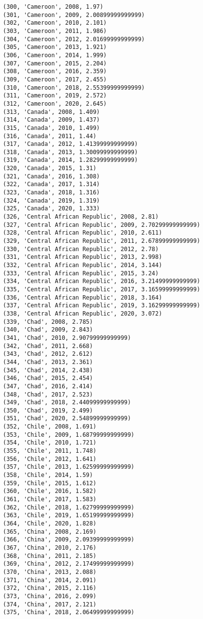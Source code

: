 \documentclass[11pt]{article}
\begin{document}
\begin{Verbatim}[commandchars=\\\{\}]
(300, 'Cameroon', 2008, 1.97)
(301, 'Cameroon', 2009, 2.00899999999999)
(302, 'Cameroon', 2010, 2.101)
(303, 'Cameroon', 2011, 1.986)
(304, 'Cameroon', 2012, 2.01699999999999)
(305, 'Cameroon', 2013, 1.921)
(306, 'Cameroon', 2014, 1.999)
(307, 'Cameroon', 2015, 2.204)
(308, 'Cameroon', 2016, 2.359)
(309, 'Cameroon', 2017, 2.455)
(310, 'Cameroon', 2018, 2.55399999999999)
(311, 'Cameroon', 2019, 2.572)
(312, 'Cameroon', 2020, 2.645)
(313, 'Canada', 2008, 1.409)
(314, 'Canada', 2009, 1.437)
(315, 'Canada', 2010, 1.499)
(316, 'Canada', 2011, 1.44)
(317, 'Canada', 2012, 1.41399999999999)
(318, 'Canada', 2013, 1.30099999999999)
(319, 'Canada', 2014, 1.28299999999999)
(320, 'Canada', 2015, 1.31)
(321, 'Canada', 2016, 1.308)
(322, 'Canada', 2017, 1.314)
(323, 'Canada', 2018, 1.316)
(324, 'Canada', 2019, 1.319)
(325, 'Canada', 2020, 1.333)
(326, 'Central African Republic', 2008, 2.81)
(327, 'Central African Republic', 2009, 2.70299999999999)
(328, 'Central African Republic', 2010, 2.611)
(329, 'Central African Republic', 2011, 2.67899999999999)
(330, 'Central African Republic', 2012, 2.78)
(331, 'Central African Republic', 2013, 2.998)
(332, 'Central African Republic', 2014, 3.144)
(333, 'Central African Republic', 2015, 3.24)
(334, 'Central African Republic', 2016, 3.21499999999999)
(335, 'Central African Republic', 2017, 3.16599999999999)
(336, 'Central African Republic', 2018, 3.164)
(337, 'Central African Republic', 2019, 3.16299999999999)
(338, 'Central African Republic', 2020, 3.072)
(339, 'Chad', 2008, 2.785)
(340, 'Chad', 2009, 2.843)
(341, 'Chad', 2010, 2.90799999999999)
(342, 'Chad', 2011, 2.668)
(343, 'Chad', 2012, 2.612)
(344, 'Chad', 2013, 2.361)
(345, 'Chad', 2014, 2.438)
(346, 'Chad', 2015, 2.454)
(347, 'Chad', 2016, 2.414)
(348, 'Chad', 2017, 2.523)
(349, 'Chad', 2018, 2.44099999999999)
(350, 'Chad', 2019, 2.499)
(351, 'Chad', 2020, 2.54899999999999)
(352, 'Chile', 2008, 1.691)
(353, 'Chile', 2009, 1.68799999999999)
(354, 'Chile', 2010, 1.721)
(355, 'Chile', 2011, 1.748)
(356, 'Chile', 2012, 1.641)
(357, 'Chile', 2013, 1.62599999999999)
(358, 'Chile', 2014, 1.59)
(359, 'Chile', 2015, 1.612)
(360, 'Chile', 2016, 1.582)
(361, 'Chile', 2017, 1.583)
(362, 'Chile', 2018, 1.62799999999999)
(363, 'Chile', 2019, 1.65199999999999)
(364, 'Chile', 2020, 1.828)
(365, 'China', 2008, 2.169)
(366, 'China', 2009, 2.09399999999999)
(367, 'China', 2010, 2.176)
(368, 'China', 2011, 2.185)
(369, 'China', 2012, 2.17499999999999)
(370, 'China', 2013, 2.088)
(371, 'China', 2014, 2.091)
(372, 'China', 2015, 2.116)
(373, 'China', 2016, 2.099)
(374, 'China', 2017, 2.121)
(375, 'China', 2018, 2.06499999999999)

\end{Verbatim}
\end{document}
